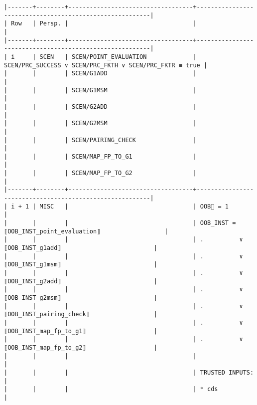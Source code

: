 \documentclass[varwidth=\maxdimen,margin=0.5cm,multi={verbatim}]{standalone}
\begin{document}
\begin{verbatim}
|-------+--------+-----------------------------------+---------------------------------------------------------|
| Row   | Persp. |                                   |                                                         |
|-------+--------+-----------------------------------+---------------------------------------------------------|
| i     | SCEN   | SCEN/POINT_EVALUATION             | SCEN/PRC_SUCCESS ∨ SCEN/PRC_FKTH ∨ SCEN/PRC_FKTR ≡ true |
|       |        | SCEN/G1ADD                        |                                                         |
|       |        | SCEN/G1MSM                        |                                                         |
|       |        | SCEN/G2ADD                        |                                                         |
|       |        | SCEN/G2MSM                        |                                                         |
|       |        | SCEN/PAIRING_CHECK                |                                                         |
|       |        | SCEN/MAP_FP_TO_G1                 |                                                         |
|       |        | SCEN/MAP_FP_TO_G2                 |                                                         |
|-------+--------+-----------------------------------+---------------------------------------------------------|
| i + 1 | MISC   |                                   | OOB🚩 = 1                                               |
|       |        |                                   | OOB_INST = ⟦OOB_INST_point_evaluation⟧                  |
|       |        |                                   | .          ∨  ⟦OOB_INST_g1add⟧                          |
|       |        |                                   | .          ∨  ⟦OOB_INST_g1msm⟧                          |
|       |        |                                   | .          ∨  ⟦OOB_INST_g2add⟧                          |
|       |        |                                   | .          ∨  ⟦OOB_INST_g2msm⟧                          |
|       |        |                                   | .          ∨  ⟦OOB_INST_pairing_check⟧                  |
|       |        |                                   | .          ∨  ⟦OOB_INST_map_fp_to_g1⟧                   |
|       |        |                                   | .          ∨  ⟦OOB_INST_map_fp_to_g2⟧                   |
|       |        |                                   |                                                         |
|       |        |                                   | TRUSTED INPUTS:                                         |
|       |        |                                   | * cds                                                   |

\end{verbatim}
\end{document}
